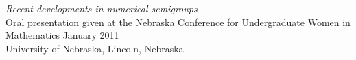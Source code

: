 \documentclass[10pt]{article}
\begin{document}
\noindent \emph{Recent developments in numerical semigroups}\\
	\indent Oral presentation given at the Nebraska Conference for Undergraduate Women in Mathematics \hfill January 2011 \\
	\indent University of Nebraska, Lincoln, Nebraska
	

%
%
%
%
%
\end{document}
